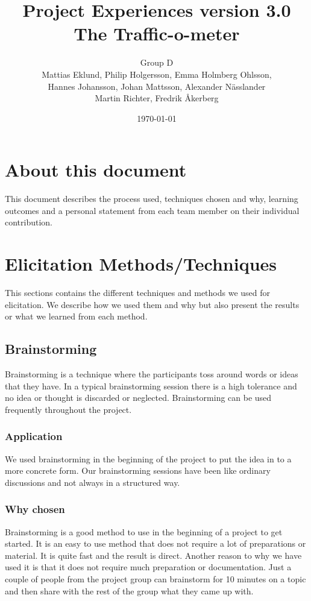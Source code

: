 \documentclass[a4paper]{article}
\title{Project Experiences version 3.0 \\ The Traffic-o-meter}
\author{Group D\\ Mattias Eklund, Philip Holgersson, Emma Holmberg Ohlsson,\\ Hannes Johansson, Johan Mattsson, Alexander Nässlander\\Martin Richter, Fredrik Åkerberg}
\date{\today}
\begin{document}
	\maketitle
	\thispagestyle{empty}
	\setcounter{page}{0}
	\pagebreak
	\tableofcontents
	\pagebreak
	
	\section{About this document}
	This document describes the process used, techniques chosen and why, learning outcomes and a personal statement from each team member on their individual contribution.
	\section{Elicitation Methods/Techniques}
This sections contains the different techniques and methods we used for elicitation. We describe how we used them and why but also present the results or what we learned from each method.
	\subsection{Brainstorming}
Brainstorming is a technique where the participants toss around words or ideas that they have. In a typical brainstorming session there is a high tolerance and no idea or thought is discarded or neglected. Brainstorming can be used frequently throughout the project.
		\subsubsection{Application}
We used brainstorming in the beginning of the project to put the idea in to a more concrete form. Our brainstorming sessions have been like ordinary discussions and not always in a structured way.
		\subsubsection{Why chosen}
Brainstorming is a good method to use in the beginning of a project to get started. It is an easy to use method that does not require a lot of preparations or material. It is quite fast and the result is direct. Another reason to why we have used it is that it does not require much preparation or documentation. Just a couple of people from the project group can brainstorm for 10 minutes on a topic and then share with the rest of the group what they came up with.
\end{document}
